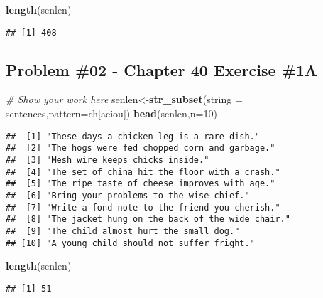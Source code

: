 \documentclass[
]{article}
\newenvironment{Shaded}{\begin{snugshade}}{\end{snugshade}}
\newcommand{\AttributeTok}[1]{\textcolor[rgb]{0.13,0.29,0.53}{#1}}
\newcommand{\CommentTok}[1]{\textcolor[rgb]{0.56,0.35,0.01}{\textit{#1}}}
\newcommand{\DecValTok}[1]{\textcolor[rgb]{0.00,0.00,0.81}{#1}}
\newcommand{\FunctionTok}[1]{\textcolor[rgb]{0.13,0.29,0.53}{\textbf{#1}}}
\newcommand{\NormalTok}[1]{#1}
\newcommand{\OtherTok}[1]{\textcolor[rgb]{0.56,0.35,0.01}{#1}}
\newcommand{\StringTok}[1]{\textcolor[rgb]{0.31,0.60,0.02}{#1}}
\begin{document}
\begin{Shaded}
\begin{Highlighting}[]
\FunctionTok{length}\NormalTok{(senlen)}
\end{Highlighting}
\end{Shaded}

\begin{verbatim}
## [1] 408
\end{verbatim}

\newpage

\hypertarget{problem-02---chapter-40-exercise-1a}{%
\subsection{Problem \#02 - Chapter 40 Exercise
\#1A}\label{problem-02---chapter-40-exercise-1a}}

\begin{Shaded}
\begin{Highlighting}[]
\CommentTok{\# Show your work here}
\NormalTok{senlen}\OtherTok{\textless{}{-}}\FunctionTok{str\_subset}\NormalTok{(}\AttributeTok{string =}\NormalTok{ sentences,}\AttributeTok{pattern=}\StringTok{\textquotesingle{}ch[aeiou]\textquotesingle{}}\NormalTok{)}
\FunctionTok{head}\NormalTok{(senlen,}\AttributeTok{n=}\DecValTok{10}\NormalTok{)}
\end{Highlighting}
\end{Shaded}

\begin{verbatim}
##  [1] "These days a chicken leg is a rare dish."      
##  [2] "The hogs were fed chopped corn and garbage."   
##  [3] "Mesh wire keeps chicks inside."                
##  [4] "The set of china hit the floor with a crash."  
##  [5] "The ripe taste of cheese improves with age."   
##  [6] "Bring your problems to the wise chief."        
##  [7] "Write a fond note to the friend you cherish."  
##  [8] "The jacket hung on the back of the wide chair."
##  [9] "The child almost hurt the small dog."          
## [10] "A young child should not suffer fright."
\end{verbatim}

\begin{Shaded}
\begin{Highlighting}[]
\FunctionTok{length}\NormalTok{(senlen)}
\end{Highlighting}
\end{Shaded}

\begin{verbatim}
## [1] 51
\end{verbatim}
\end{document}
